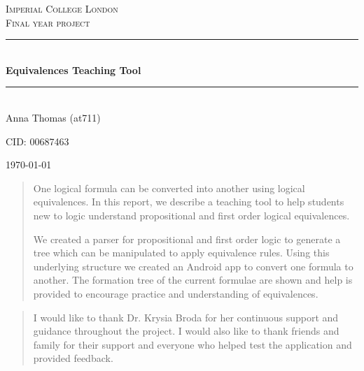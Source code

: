 \documentclass[draft]{report}
\newcommand{\HRule}{\rule{\linewidth}{0.5mm}}
\begin{document}
\expandafter\def\csname PY@tok@err\endcsname{}
\renewcommand{\abstractname}{\large Abstract}

\begin{titlepage}
\begin{center}

\textsc{\LARGE Imperial College London}\\[1.5cm]

\textsc{\Large Final year project}\\[0.5cm]

\HRule \\[0.4cm]
{ \huge \bfseries Equivalences Teaching Tool \\[0.4cm] }

\HRule \\[1.5cm]

Anna Thomas (at711)

CID: 00687463

\vfill

{\large \today}

\end{center}
\end{titlepage}

\begin{abstract}
One logical formula can be converted into another using logical equivalences. In this report, we describe a teaching tool to help students new to logic understand propositional and first order logical equivalences.

We created a parser for propositional and first order logic to generate a tree which can be manipulated to apply equivalence rules. Using this underlying structure we created an Android app to convert one formula to another. The formation tree of the current formulae are shown and help is provided to encourage practice and understanding of equivalences.

\end{abstract}

\renewcommand{\abstractname}{\large Acknowledgements}
\begin{abstract}
I would like to thank Dr. Krysia Broda for her continuous support and guidance throughout the project. I would also like to thank friends and family for their support and everyone who helped test the application and provided feedback.
\end{abstract}

\tableofcontents
\end{document}
